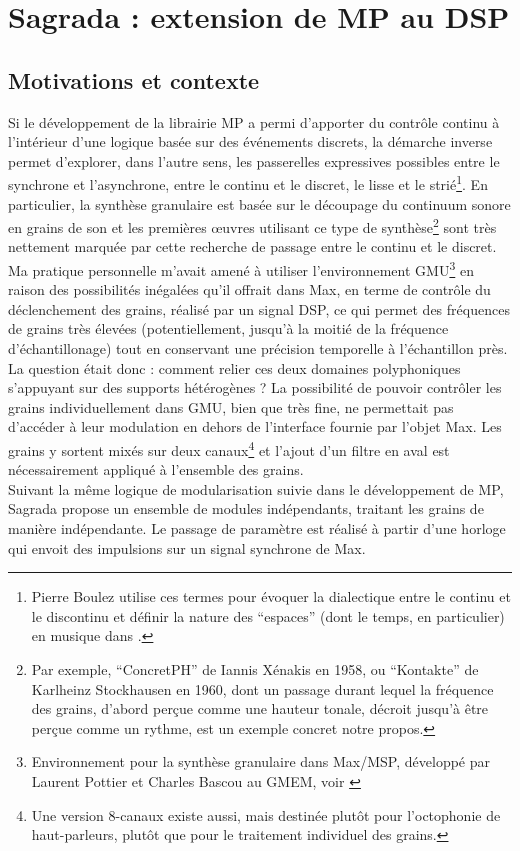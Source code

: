 \section{Sagrada : extension de MP au DSP}
\label{sec:algorithms:sagrada}

\subsection{Motivations et contexte}

\noindent Si le développement de la librairie MP a permi d'apporter du contrôle continu à l'intérieur d'une logique basée sur des événements discrets, la démarche inverse permet d'explorer, dans l'autre sens, les passerelles expressives possibles entre le synchrone et l'asynchrone, entre le continu et le discret, le lisse et le strié\footnote{Pierre Boulez utilise ces termes pour évoquer la dialectique entre le continu et le discontinu et définir la nature des ``espaces'' (dont le temps, en particulier) en musique dans \cite{boulez_penser_1987}.}. En particulier, la synthèse granulaire est basée sur le découpage du continuum sonore en grains de son et les premières œuvres utilisant ce type de synthèse\footnote{Par exemple, ``ConcretPH'' de Iannis Xénakis en 1958, ou ``Kontakte'' de Karlheinz Stockhausen en 1960, dont un passage durant lequel la fréquence des grains, d'abord perçue comme une hauteur tonale, décroit jusqu'à être perçue comme un rythme, est un exemple concret notre propos.} sont très nettement marquée par cette recherche de passage entre le continu et le discret.\\
\indent Ma pratique personnelle m'avait amené à utiliser l'environnement GMU\footnote{Environnement pour la synthèse granulaire dans Max/MSP, développé par Laurent Pottier et Charles Bascou au \gls{GMEM}, voir \cite{bascou_gmu_2005}} en raison des possibilités inégalées qu'il offrait dans Max, en terme de contrôle du déclenchement des grains, réalisé par un signal \gls{DSP}, ce qui permet des fréquences de grains très élevées (potentiellement, jusqu'à la moitié de la fréquence d'échantillonage) tout en conservant une précision temporelle à l'échantillon près.\\
\indent La question était donc : comment relier ces deux domaines polyphoniques s'appuyant sur des supports hétérogènes ? La possibilité de pouvoir contrôler les grains individuellement dans GMU, bien que très fine, ne permettait pas d'accéder à leur modulation en dehors de l'interface fournie par l'objet Max. Les grains y sortent mixés sur deux canaux\footnote{Une version 8-canaux existe aussi, mais destinée plutôt pour l'octophonie de haut-parleurs, plutôt que pour le traitement individuel des grains.} et l'ajout d'un filtre en aval est nécessairement appliqué à l'ensemble des grains.\\
\indent Suivant la même logique de modularisation suivie dans le développement de MP, Sagrada propose un ensemble de modules indépendants, traitant les grains de manière indépendante. Le passage de paramètre est réalisé à partir d'une horloge qui envoit des impulsions sur un signal synchrone de Max.

